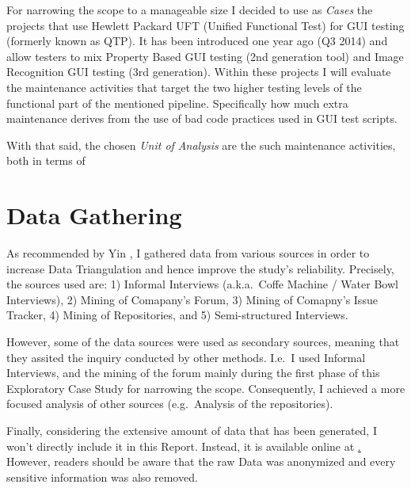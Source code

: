 
For narrowing the scope to a manageable size I decided to use as \textit{Cases} the projects that use Hewlett Packard UFT (Unified Functional Test) for GUI testing (formerly known as QTP). It has been introduced one year ago (Q3 2014) and allow testers to mix Property Based GUI testing (2nd generation tool) and Image Recognition GUI testing (3rd generation). Within these projects I will evaluate the maintenance activities that target the two higher testing levels of the functional part of the mentioned pipeline. Specifically how much extra maintenance derives from the use of bad code practices used in GUI test scripts.

With that said, the chosen \textit{Unit of Analysis} are the such maintenance activities, both in terms of 
    

%
%
%
%

%
%
%
%
\section{Data Gathering}
As recommended by Yin \cite{case_study_guide,case_study_software_engineering}, I gathered data from various sources in order to increase Data Triangulation and hence improve the study's reliability. Precisely, the sources used are: 1) Informal Interviews (a.k.a.\ Coffe Machine / Water Bowl Interviews), 2) Mining of Comapany's Forum, 3) Mining of Comapny's Issue Tracker, 4) Mining of Repositories, and 5) Semi-structured Interviews.

However, some of the data sources were used as secondary sources, meaning that they assited the inquiry conducted by other methods. I.e.\ I used Informal Interviews, and the mining of the forum mainly during the first phase of this Exploratory Case Study for narrowing the scope. Consequently, I achieved a more focused analysis of other sources (e.g.\ Analysis of the repositories).

Finally, considering the extensive amount of data that has been generated, I won't directly include it in this Report. Instead, it is available online at \href{http://somthing/}. However, readers should be aware that the raw Data was anonymized and every sensitive information was also removed. 



